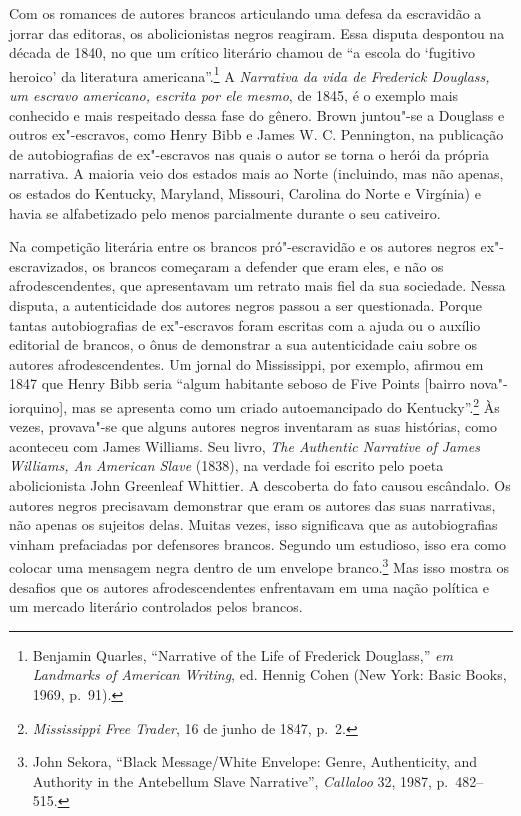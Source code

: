 Com os romances de autores brancos articulando uma defesa da escravidão
a jorrar das editoras, os abolicionistas negros reagiram. Essa disputa
despontou na década de 1840, no que um crítico literário chamou de ``a
escola do `fugitivo heroico' da literatura americana''.\footnote{Benjamin
  Quarles, ``Narrative of the Life of Frederick Douglass,'' \emph{em
  Landmarks of American Writing}, ed. Hennig Cohen (New York: Basic
  Books, 1969, p.~91).} A \emph{Narrativa da vida de Frederick Douglass, um
escravo americano, escrita por ele mesmo}, de 1845, é o exemplo mais
conhecido e mais respeitado dessa fase do gênero. Brown juntou"-se a
Douglass e outros ex"-escravos, como Henry Bibb e James W. C. Pennington,
na publicação de autobiografias de ex"-escravos nas quais o autor se
torna o herói da própria narrativa. A maioria veio dos estados mais ao
Norte (incluindo, mas não apenas, os estados do Kentucky, Maryland,
Missouri, Carolina do Norte e Virgínia) e havia se alfabetizado pelo
menos parcialmente durante o seu cativeiro.

Na competição literária entre os brancos pró"-escravidão e os autores
negros ex"-escravizados, os brancos começaram a defender que eram eles, e
não os afrodescendentes, que apresentavam um retrato mais fiel da sua
sociedade. Nessa disputa, a autenticidade dos autores negros passou a
ser questionada. Porque tantas autobiografias de ex"-escravos foram
escritas com a ajuda ou o auxílio editorial de brancos, o ônus de
demonstrar a sua autenticidade caiu sobre os autores afrodescendentes.
Um jornal do Mississippi, por exemplo, afirmou em 1847 que Henry Bibb
seria ``algum habitante seboso de Five Points {[}bairro
nova"-iorquino{]}, mas se apresenta como um criado autoemancipado do
Kentucky''.\footnote{\emph{Mississippi Free Trader}, 16 de junho de 1847,
  p.~2.} Às vezes, provava"-se que alguns autores negros inventaram as suas
histórias, como aconteceu com James Williams. Seu livro, \emph{The
Authentic Narrative of James Williams, An American Slave} (1838), na
verdade foi escrito pelo poeta abolicionista John Greenleaf Whittier. A
descoberta do fato causou escândalo. Os autores negros precisavam
demonstrar que eram os autores das suas narrativas, não apenas os
sujeitos delas. Muitas vezes, isso significava que as autobiografias
vinham prefaciadas por defensores brancos. Segundo um estudioso, isso
era como colocar uma mensagem negra dentro de um envelope
branco.\footnote{John Sekora, ``Black Message/White Envelope: Genre,
  Authenticity, and Authority in the Antebellum Slave Narrative'',
  \emph{Callaloo} 32, 1987, p.~482--515.} Mas isso mostra os desafios que
os autores afrodescendentes enfrentavam em uma nação política e um
mercado literário controlados pelos brancos.

